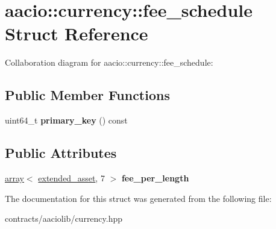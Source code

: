 \hypertarget{structaacio_1_1currency_1_1fee__schedule}{}\section{aacio\+:\+:currency\+:\+:fee\+\_\+schedule Struct Reference}
\label{structaacio_1_1currency_1_1fee__schedule}


Collaboration diagram for aacio\+:\+:currency\+:\+:fee\+\_\+schedule\+:
\subsection*{Public Member Functions}
\begin{DoxyCompactItemize}
\item 
\mbox{\label{structaacio_1_1currency_1_1fee__schedule_a410fcdb017e38e6b6ea75a1d91195e24}} 
uint64\+\_\+t {\bfseries primary\+\_\+key} () const
\end{DoxyCompactItemize}
\subsection*{Public Attributes}
\begin{DoxyCompactItemize}
\item 
\mbox{\label{structaacio_1_1currency_1_1fee__schedule_a3dfeb5d3b70f022da0277773c7be688e}} 
\mbox{\hyperlink{classfc_1_1array}{array}}$<$ \mbox{\hyperlink{structaacio_1_1extended__asset}{extended\+\_\+asset}}, 7 $>$ {\bfseries fee\+\_\+per\+\_\+length}
\end{DoxyCompactItemize}


The documentation for this struct was generated from the following file\+:\begin{DoxyCompactItemize}
\item 
contracts/aaciolib/currency.\+hpp\end{DoxyCompactItemize}
